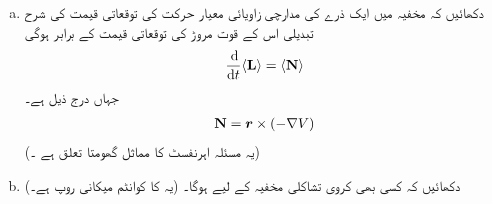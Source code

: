 \begin{enumerate}[a.]
\item
دکھائیں کہ  مخفیہ    میں ایک ذرے کی مدارچی زاویائی معیار حرکت  کی توقعاتی قیمت کی شرح  تبدیلی اس کے قوت مروڑ کی توقعاتی قیمت کے برابر ہوگی 
\begin{align*}
\frac{\dif}{\dif t} \langle \mat{L} \rangle = \langle \mat{N} \rangle
\end{align*}
جہاں  درج ذیل ہے۔
\begin{align*}
\operatorname{\mathbf{N}} = {{\boldsymbol{r}}} \times (- \nabla V)
\end{align*}
(یہ مسئلہ اہرنفسٹ کا مماثل گھومتا تعلق ہے ۔)
\item
دکھائیں کہ  کسی بھی کروی تشاکلی مخفیہ کے لیے  ہوگا۔ (یہ  کا کوانٹم میکانی روپ ہے۔) 
\end{enumerate}


